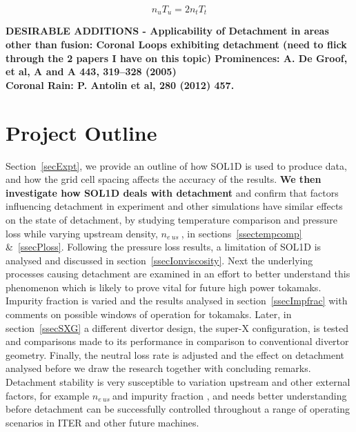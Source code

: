 \documentclass[12pt]{article}  %
\providecommand{\neus}{$n_{e~us}~$} %
\begin{document}
  \begin{equation}\label{eqPus_tg}
  n_uT_u = 2n_tT_t
  \end{equation}

\textbf{DESIRABLE ADDITIONS - Applicability of Detachment in areas other than fusion: Coronal Loops exhibiting detachment (need to flick through the 2 papers I have on this topic) 
Prominences: A. De Groof, et al, A and A 443, 319–328 (2005)}\\

\textbf{Coronal Rain: P. Antolin et al, 280 (2012) 457.}\\

\section{Project Outline}\label{secOutline}
Section~\ref{secExpt}, we provide an outline of how SOL1D is used to produce data, and how the grid cell spacing affects the accuracy of the results. \textbf{We then investigate how SOL1D deals with detachment} and confirm that factors influencing detachment in experiment and other simulations have similar effects on the state of detachment, by studying temperature comparison and pressure loss while varying upstream density, \neus, in sections~\ref{ssectempcomp} \&~\ref{ssecPloss}. Following the pressure loss results, a limitation of SOL1D is analysed and discussed in section~\ref{ssecIonviscosity}.  Next the underlying processes causing detachment are examined in an effort to better understand this phenomenon which is likely to prove vital for future high power tokamaks. Impurity fraction is varied and the results analysed in section~\ref{ssecImpfrac} with comments on possible windows of operation for tokamaks. Later, in section~\ref{ssecSXG} a different divertor design, the super-X configuration, is tested and comparisons made to its performance in comparison to conventional divertor geometry. Finally, the neutral loss rate is adjusted and the effect on detachment analysed before we draw the research together with concluding remarks. Detachment stability is very susceptible to variation upstream and other external factors, for example \neus and impurity fraction \cite{Lipschultz2016}, and needs better understanding before detachment can be successfully controlled throughout a range of operating scenarios in ITER and other future machines. 
\end{document}
